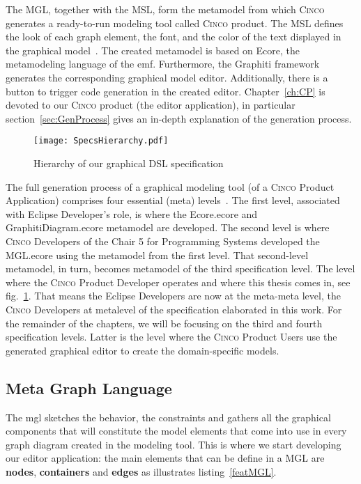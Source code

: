 The MGL, together with the MSL, form the metamodel from which \textsc{Cinco} generates a ready-to-run modeling tool called \textsc{Cinco} product. The MSL defines the look of each graph element, the font, and the color of the text displayed in the graphical model~\cite{naujokat-diss}. The created metamodel is based on Ecore, the metamodeling language of the \gls{emf}. Furthermore, the Graphiti framework generates the corresponding graphical model editor. Additionally, there is a button to trigger code generation in the created editor. Chapter~\ref{ch:CP} is devoted to our \textsc{Cinco} product (the editor application), in particular section~\ref{sec:GenProcess} gives an in-depth explanation of the generation process.

\begin{figure}[h]
    \centering
    \texttt{[image: SpecsHierarchy.pdf]}
    \caption{Hierarchy of our graphical DSL specification}
    \label{fig:modeling-hierachy}
\end{figure}

The full generation process of a graphical modeling tool (of a \textsc{Cinco} Product Application) comprises four essential (meta) levels~\cite{Naujokat2018}. The first level, associated with Eclipse Developer's role, is where the Ecore.ecore and GraphitiDiagram.ecore metamodel are developed. The second level is where \textsc{Cinco} Developers of the Chair 5 for Programming Systems developed the MGL.ecore using the metamodel from the first level. That second-level metamodel, in turn, becomes metamodel of the third specification level. The level where the \textsc{Cinco} Product Developer operates and where this thesis comes in, see fig.~\ref{fig:modeling-hierachy}. That means the Eclipse Developers are now at the meta-meta level, the \textsc{Cinco} Developers at metalevel of the specification elaborated in this work. For the remainder of the chapters, we will be focusing on the third and fourth specification levels. Latter is the level where the \textsc{Cinco} Product Users use the generated graphical editor to create the domain-specific models.

\subsection{Meta Graph Language}\label{sec:MGL}

The \gls*{mgl} sketches the behavior, the constraints and gathers all the graphical components that will constitute the model elements that come into use in every graph diagram created in the modeling tool. This is where we start developing our editor application: the main elements that can be define in a MGL are \textbf{nodes}, \textbf{containers} and \textbf{edges} as illustrates listing~\ref{featMGL}.

